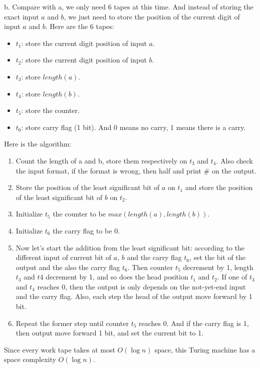 \documentclass[12pt]{article}
\begin{document}
b. Compare with a, we only need 6 tapes at this time. And instead of
storing the exact input $a$ and $b$, we just need to store the
position of the current digit of input $a$ and $b$. Here are the 6
tapes:

\begin{itemize}
\item $t_1$: store the current digit position of input $a$.
\item $t_2$: store the current digit position of input $b$.
\item $t_3$: store $length(a)$.
\item $t_4$: store $length(b)$.
\item $t_5$: store the counter.
\item $t_6$: store carry flag (1 bit). And 0 means no carry, 1 means
  there is a carry.
\end{itemize}

Here is the algorithm:

\begin{enumerate}
\item Count the length of a and b, store them respectively on $t_3$ and
  $t_4$. Also check the input format, if the format is wrong, then half
  and print \# on the output. 
\item Store the position of the least significant bit of $a$ on $t_1$
  and store the position of the least significant bit of $b$ on
  $t_2$.
\item Initialize $t_5$ the counter to be $max(length(a), length(b))$. 
\item Initialize $t_6$ the carry flag to be $0$.
\item Now let's start the addition from the least significant bit:
  according to the different input of current bit of $a$, $b$ and the
  carry flag $t_6$, set the bit of the output and the also the carry
  flag $t_6$. Then counter $t_5$ decrement by 1, length $t_3$ and $t4$
  decrement by 1, and so does the head position $t_1$ and $t_2$. If
  one of $t_3$ and $t_4$ reaches 0, then the output is only depends on
  the not-yet-end input and the carry flag. Also, each step the head
  of the output move forward by 1 bit.
\item Repeat the former step until counter $t_5$ reaches 0. And if the
  carry flag is 1, then output move forward 1 bit, and set the current
  bit to 1.
\end{enumerate}

Since every work tape takes at most $O(\log n)$ space, this Turing
machine has a space complexity $O(\log n)$.\\
\end{document}
